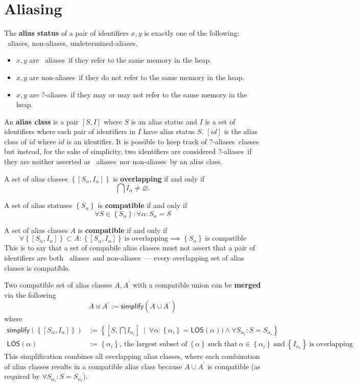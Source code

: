 \documentclass{article}
\newcommand{\tsf}{\textsf}
\newcommand{\tbf}{\textbf}
\newcommand{\set}[1]{\left\{ #1 \right\}}
\newcommand{\p}{^\prime}
\renewcommand{\empty}{\varnothing}
\newcommand{\aliases}{\ \tsf{aliases}}
\newcommand{\nonaliases}{\tsf{non-aliases}}
\newcommand{\unaliases}{\tsf{?-aliases}}
\newcommand{\merge}{\uplus}
\begin{document}
\section{Aliasing}

The \tbf{alias status} of a pair of identifiers $x,y$ is exactly one of the following: \aliases, \nonaliases, \tsf{undetermined-aliases}.
\begin{itemize}
\item $x,y$ are \aliases \ if they refer to the same memory in the heap.
\item $x,y$ are \nonaliases \ if they do not refer to the same memory in the heap.
\item $x,y$ are \unaliases \ if they may or may not refer to the same memory in the heap.
\end{itemize}

\noindent
An \tbf{alias class} is a pair $[S,I]$ where $S$ is an alias status and $I$ is a set of identifiers where each pair of identifiers in $I$ have alias status $S$.
$[id]$ is the alias class of $id$ where $id$ is an identifier.
It is possible to keep track of \unaliases\ classes but instead, for the sake of simplicity, two identifiers are considered \unaliases\ if they are neither asserted as \aliases\ nor \nonaliases\ by an alias class.

\noindent
A set of alias classes $\set{ [S_\alpha, I_\alpha] }$ is \tbf{overlapping} if and only if
$$ \bigcap I_\alpha \neq \empty. $$

\noindent
A set of alias statuses $\set{ S_\alpha }$ is \tbf{compatible} if and only if
$$ \forall S \in \set{S_\alpha} : \forall \alpha : S_\alpha = S $$

\noindent
A set of alias classes $A$ is \tbf{compatible} if and only if
$$
\forall \set{ [S_\alpha, I_\alpha] } \subset A :
\set{ [S_\alpha, I_\alpha] } \ \text{is overlapping}
\implies
\set{ S_\alpha } \ \text{is compatible}
$$
This is to say that a set of compabile alias classes must not assert that a pair of identifiers are both \aliases\ and \nonaliases\ --- every overlapping set of alias classes is compatible.

\noindent
Two compatible set of alias classes $A, A\p$ with a compatible union can be \tbf{merged} via the following
$$ A \merge A\p := \tsf{simplify}(A \cup A\p) $$
where
\begin{align*}
\tsf{simplify}(\set{ [S_\alpha, I_\alpha] })
& :=
\set{
  \left[ S, \bigcap I_{\alpha_i} \right]
  \ \mid \
  \forall \alpha :
  \set{ \alpha_i } = \tsf{LOS}(\alpha))
  \land
  \forall S_{\alpha_i} :
  S = S_{\alpha_i}
}
\\
\tsf{LOS}(\alpha)
& :=
\set{ \alpha_i }, \
\text{the largest subset of} \ \set{ \alpha } \
\text{such that} \ \alpha \in \set{ \alpha_i } \
\text{and} \ \set{ I_{\alpha_i} } \ \text{is overlapping}
\end{align*}
This simplification combines all overlapping alias classes,
where each combination of alias classes results in a compatible alias class
because $A \cup A\p$ is compatible (as required by $\forall S_{\alpha_i} :
S = S_{\alpha_i}$).
\end{document}

